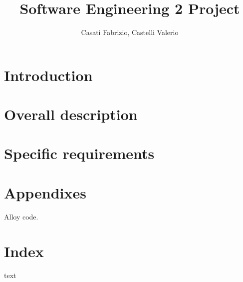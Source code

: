 



\title{Software Engineering 2 Project}
\author{Casati Fabrizio, Castelli Valerio}

\maketitle
\tableofcontents

\chapter{Introduction}


\chapter{Overall description}


\chapter{Specific requirements}


\chapter*{Appendixes}
Alloy code.

\chapter*{Index}
text

